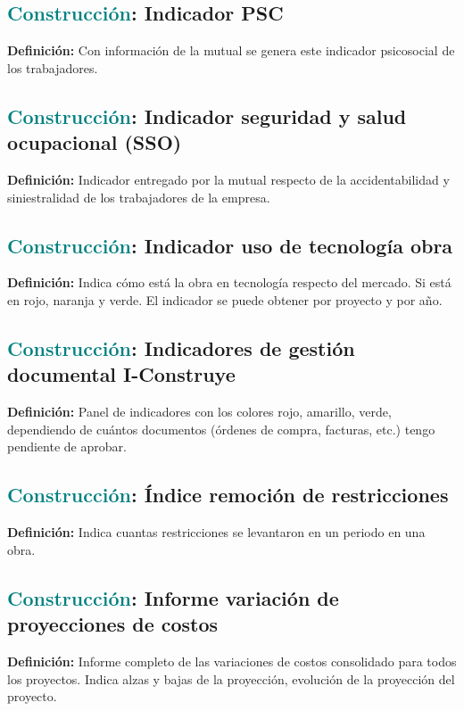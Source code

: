 \documentclass[12pt]{article}
\begin{document}
\subsection{\textcolor{teal}{Construcción}: Indicador PSC}
\textbf{Definición:} Con información de la mutual se genera este indicador psicosocial de los trabajadores.
\subsection{\textcolor{teal}{Construcción}: Indicador seguridad y salud ocupacional (SSO)}
\textbf{Definición:} Indicador entregado por la mutual respecto de la accidentabilidad y siniestralidad de los trabajadores de la empresa.
\subsection{\textcolor{teal}{Construcción}: Indicador uso de tecnología obra}
\textbf{Definición:} Indica cómo está la obra en tecnología respecto del mercado. Si está en rojo, naranja y verde. El indicador se puede obtener por proyecto y por año.
\subsection{\textcolor{teal}{Construcción}: Indicadores de gestión documental I-Construye}
\textbf{Definición:} Panel de indicadores con los colores rojo, amarillo, verde, dependiendo de cuántos documentos (órdenes de compra, facturas, etc.) tengo pendiente de aprobar.
\subsection{\textcolor{teal}{Construcción}: Índice remoción de restricciones}
\textbf{Definición:} Indica cuantas restricciones se levantaron en un periodo en una obra.
\subsection{\textcolor{teal}{Construcción}: Informe variación de proyecciones de costos}
\textbf{Definición:} Informe completo de las variaciones de costos consolidado para todos los proyectos. Indica alzas y bajas de la proyección, evolución de la proyección del proyecto.
\end{document}
